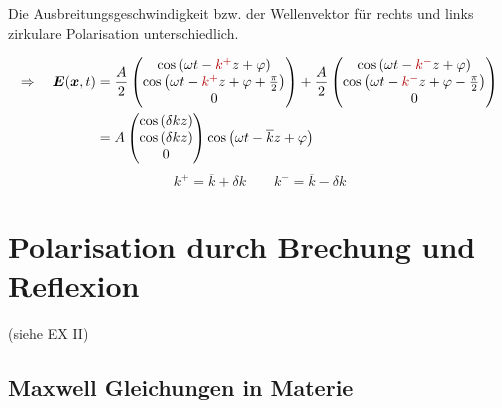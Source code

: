 \documentclass[titlepage,11pt,a4paper,ngerman]{report}
\renewcommand{\vec}[1]{\boldsymbol{#1}}
\begin{document}
Die Ausbreitungsgeschwindigkeit bzw. der Wellenvektor für rechts und links zirkulare Polarisation unterschiedlich.

\begin{align*}
\Rightarrow \quad \vec{E}(\vec{x},t) &= \frac{A}{2} \begin{pmatrix}
\cos\left(\omega t - \color{black!30!red}k^+\color{black}z + \varphi\right) \\ \cos\left(\omega t -\color{black!30!red}k^+\color{black}z + \varphi + \frac{\pi}{2}\right) \\ 0
\end{pmatrix} + \frac{A}{2} \begin{pmatrix}
\cos\left(\omega t - \color{black!30!red}k^-\color{black}z + \varphi\right) \\ \cos\left(\omega t - \color{black!30!red}k^-\color{black}z+\varphi-\frac{\pi}{2}\right) \\ 0
\end{pmatrix}\\
&=A \begin{pmatrix}
\cos\left(\delta kz\right) \\ \cos\left(\delta kz\right) \\ 0
\end{pmatrix} \cos\left(\omega t - \overline{k}z + \varphi\right)
\end{align*}
\begin{equation*}
k^+ = \overline{k} + \delta k \qquad k^- = \overline{k} - \delta k
\end{equation*}

\section{Polarisation durch Brechung und Reflexion}

(siehe EX II)

\subsection{Maxwell Gleichungen in Materie}
\end{document}
